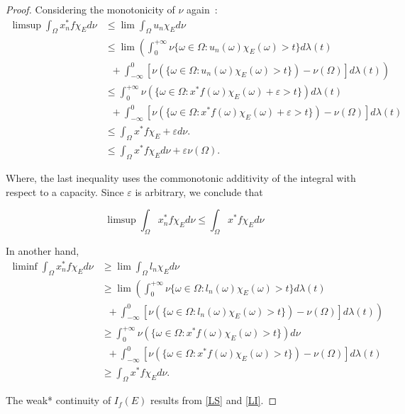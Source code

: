 \documentclass[preprint,authoryear,12pt]{article}%
\theoremstyle{definition}
\begin{document}
\begin{proof}
Considering the monotonicity of $\nu$ again~: 
\begin{equation}\begin{array}{rl} 
\limsup \int_\Omega x_n^* f \chi_E d\nu &\leq \lim\int_\Omega u_n \chi_E d\nu\\
&\leq \lim \left(\int_0^{+\infty} \nu\{\omega\in \Omega :u_n(\omega) \chi_E(\omega)>t\} d\lambda (t)\right.\\
&\left.\;\; +\int^0_{-\infty}\left[ \nu(\{\omega\in \Omega : u_n(\omega)\chi_E(\omega)>t\}) -\nu(\Omega)\right]d\lambda(t)\right)\\
&\leq \int_{0}^{+\infty}\nu(\{\omega\in \Omega: x^* f(\omega)\chi_E(\omega)+\varepsilon>t\})d\lambda(t)\\
&\;\;+\int^0_{-\infty}\left[ \nu(\{\omega\in \Omega : x^*f(\omega)\chi_E(\omega)+\varepsilon>t\}) -\nu(\Omega)\right]d\lambda(t) \\
&\leq \int_\Omega x^*f \chi_E+\varepsilon d\nu.\\
&\leq \int_\Omega x^*f \chi_E d\nu +\varepsilon \nu(\Omega). 
\end{array}
\end{equation}


Where, the last inequality uses the commonotonic additivity of the integral with respect to a capacity. Since $\varepsilon$ is arbitrary, we conclude that 

\begin{equation}\label{LS}
\limsup \int_\Omega x_n^* f\chi_E d\nu  \leq \int_\Omega x^*f \chi_E d\nu
\end{equation}

In another hand,  
\begin{equation}\label{LI}
\begin{array}{rl}
\liminf \int_\Omega x_n^* f \chi_E d\nu &\geq \lim\int_\Omega l_n\chi_E d\nu \\
&\geq \lim \left(\int_0^{+\infty} \nu\{\omega\in \Omega :l_n(\omega)\chi_E(\omega)>t\} d\lambda (t)\right.\\
&\left.\;\; +\int^0_{-\infty}\left[ \nu(\{\omega\in \Omega : l_n(\omega)\chi_E(\omega)>t\}) -\nu(\Omega)\right]d\lambda(t)\right)\\
&\geq \int_0^{+\infty}\nu(\{\omega\in \Omega: x^* f(\omega)\chi_E(\omega)>t\})d\nu\\
&\;\;+\int^0_{-\infty}\left[ \nu(\{\omega\in \Omega : x^*f(\omega)\chi_E(\omega)>t\}) -\nu(\Omega)\right]d\lambda(t) \\
&\geq \int_\Omega x^*f\chi_E d\nu.

\end{array}
\end{equation}

The weak* continuity of $I_f(E)$ results from \eqref{LS} and \eqref{LI}.

\end{proof}
\end{document}

